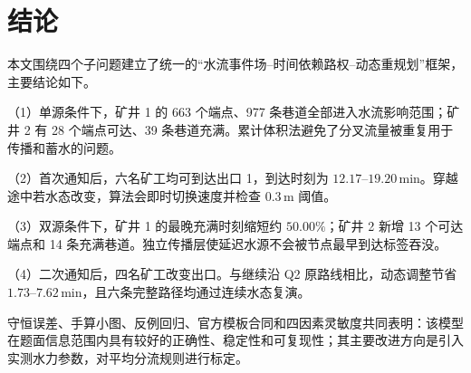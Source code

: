 \section{结论}

本文围绕四个子问题建立了统一的“水流事件场--时间依赖路权--动态重规划”框架，主要结论如下。

（1）单源条件下，矿井 1 的 663 个端点、977 条巷道全部进入水流影响范围；矿井 2 有 28 个端点可达、39 条巷道充满。累计体积法避免了分叉流量被重复用于传播和蓄水的问题。

（2）首次通知后，六名矿工均可到达出口 1，到达时刻为 $12.17$--$19.20\,\mathrm{min}$。穿越途中若水态改变，算法会即时切换速度并检查 $0.3\,\mathrm{m}$ 阈值。

（3）双源条件下，矿井 1 的最晚充满时刻缩短约 $50.00\%$；矿井 2 新增 13 个可达端点和 14 条充满巷道。独立传播层使延迟水源不会被节点最早到达标签吞没。

（4）二次通知后，四名矿工改变出口。与继续沿 Q2 原路线相比，动态调整节省 $1.73$--$7.62\,\mathrm{min}$，且六条完整路径均通过连续水态复演。

守恒误差、手算小图、反例回归、官方模板合同和四因素灵敏度共同表明：该模型在题面信息范围内具有较好的正确性、稳定性和可复现性；其主要改进方向是引入实测水力参数，对平均分流规则进行标定。
